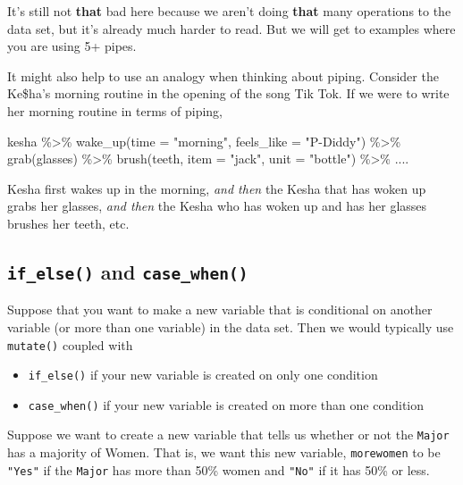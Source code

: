 \documentclass[
]{book}
\newenvironment{Shaded}{\begin{snugshade}}{\end{snugshade}}
\newcommand{\AttributeTok}[1]{\textcolor[rgb]{0.77,0.63,0.00}{#1}}
\newcommand{\FunctionTok}[1]{\textcolor[rgb]{0.00,0.00,0.00}{#1}}
\newcommand{\NormalTok}[1]{#1}
\newcommand{\SpecialCharTok}[1]{\textcolor[rgb]{0.00,0.00,0.00}{#1}}
\newcommand{\StringTok}[1]{\textcolor[rgb]{0.31,0.60,0.02}{#1}}
\providecommand{\tightlist}{%
  \setlength{\itemsep}{0pt}\setlength{\parskip}{0pt}}
\begin{document}
It's still not \textbf{that} bad here because we aren't doing \textbf{that} many operations to the data set, but it's already much harder to read. But we will get to examples where you are using 5+ pipes.

It might also help to use an analogy when thinking about piping. Consider the Ke\$ha's morning routine in the opening of the song Tik Tok. If we were to write her morning routine in terms of piping,

\begin{Shaded}
\begin{Highlighting}[]
\NormalTok{kesha }\SpecialCharTok{\%\textgreater{}\%} \FunctionTok{wake\_up}\NormalTok{(}\AttributeTok{time =} \StringTok{"morning"}\NormalTok{, }\AttributeTok{feels\_like =} \StringTok{"P{-}Diddy"}\NormalTok{) }\SpecialCharTok{\%\textgreater{}\%}
  \FunctionTok{grab}\NormalTok{(glasses) }\SpecialCharTok{\%\textgreater{}\%}
  \FunctionTok{brush}\NormalTok{(teeth, }\AttributeTok{item =} \StringTok{"jack"}\NormalTok{, }\AttributeTok{unit =} \StringTok{"bottle"}\NormalTok{) }\SpecialCharTok{\%\textgreater{}\%}\NormalTok{ ....}
\end{Highlighting}
\end{Shaded}

Kesha first wakes up in the morning, \emph{and then} the Kesha that has woken up grabs her glasses, \emph{and then} the Kesha who has woken up and has her glasses brushes her teeth, etc.

\hypertarget{if_else-and-case_when}{%
\subsection{\texorpdfstring{\texttt{if\_else()} and \texttt{case\_when()}}{if\_else() and case\_when()}}\label{if_else-and-case_when}}

Suppose that you want to make a new variable that is conditional on another variable (or more than one variable) in the data set. Then we would typically use \texttt{mutate()} coupled with

\begin{itemize}
\tightlist
\item
  \texttt{if\_else()} if your new variable is created on only one condition
\item
  \texttt{case\_when()} if your new variable is created on more than one condition
\end{itemize}

Suppose we want to create a new variable that tells us whether or not the \texttt{Major} has a majority of Women. That is, we want this new variable, \texttt{morewomen} to be \texttt{"Yes"} if the \texttt{Major} has more than 50\% women and \texttt{"No"} if it has 50\% or less.
\end{document}
